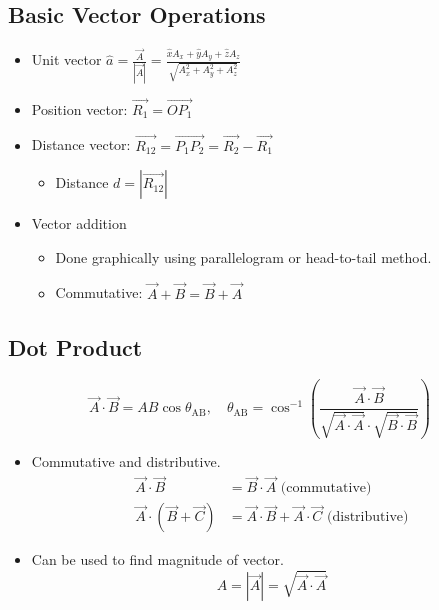 \documentclass[a4paper]{article}
\begin{document}
\subsection{Basic Vector Operations}
\begin{itemize}
    \item Unit vector $\hat{a} = \displaystyle\frac{\overrightarrow{A}}{|\overrightarrow{A}|} = \displaystyle\frac{\hat{x}A_x+\hat{y}A_y+\hat{z}A_z}{\sqrt{A_x^2+A_y^2+A_z^2}}$
    \item Position vector: $\overrightarrow{R_1} = \overrightarrow{OP_1}$
    \item Distance vector: $\overrightarrow{R_{12}} = \overrightarrow{P_1P_2} = \overrightarrow{R_2}-\overrightarrow{R_1}$
    \begin{itemize}[label=$\circ$]
        \item Distance $d = |\overrightarrow{R_{12}}|$
    \end{itemize}
    \item Vector addition
    \begin{itemize}[label=$\circ$]
        \item Done graphically using parallelogram or head-to-tail method.
        \item Commutative: $\overrightarrow{A} + \overrightarrow{B} = \overrightarrow{B} + \overrightarrow{A}$
    \end{itemize}
\end{itemize}

\subsection{Dot Product}
$$\overrightarrow{A}\cdot\overrightarrow{B} = AB\cos\theta_\text{AB},\quad \theta_\text{AB} = \cos^{-1}\left(\frac{\overrightarrow{A}\cdot\overrightarrow{B}}{\sqrt{\overrightarrow{A}\cdot\overrightarrow{A}}\cdot\sqrt{\overrightarrow{B}\cdot\overrightarrow{B}}}\right)$$
\begin{itemize}
    \item Commutative and distributive.
        \begin{align*}
            \overrightarrow{A}\cdot\overrightarrow{B} &= \overrightarrow{B}\cdot\overrightarrow{A}\text{ (commutative)}\\
            \overrightarrow{A}\cdot(\overrightarrow{B}+\overrightarrow{C}) &= \overrightarrow{A}\cdot\overrightarrow{B}+\overrightarrow{A}\cdot\overrightarrow{C}\text{ (distributive)}
        \end{align*}
    \item Can be used to find magnitude of vector.
    $$A = |\overrightarrow{A}| = \sqrt{\overrightarrow{A}\cdot\overrightarrow{A}}$$
\end{itemize}
\end{document}
